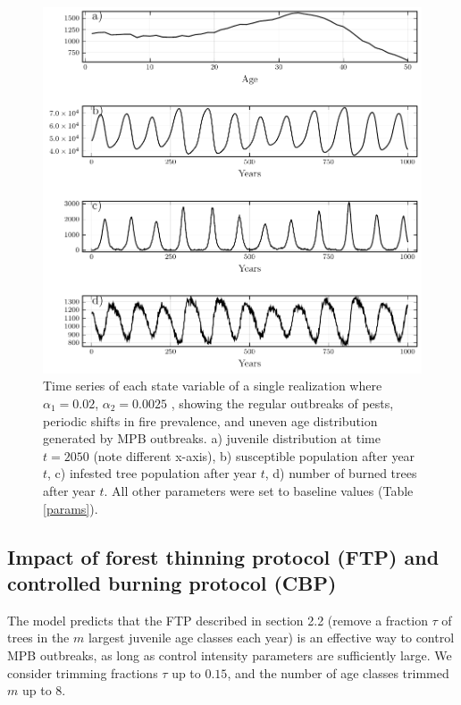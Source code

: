     
    \begin{figure}
      \includegraphics[width=\textwidth]{chapter_3/z1_ts.pdf}
      \caption{Time series of each state variable of a single realization where  $\alpha_1 = 0.02$, $\alpha_2 = 0.0025$ , showing the regular outbreaks of pests, periodic shifts in fire prevalence, and uneven age distribution generated by MPB outbreaks. a) juvenile distribution at time $t=2050$ (note different x-axis), b) susceptible population after year $t$, c) infested tree population after year $t$, d) number of burned trees after year $t$. All other parameters were set to baseline values (Table \ref{params}).}
      \label{z1}
    \end{figure}
    
\subsection{Impact of forest thinning protocol (FTP) and controlled burning protocol (CBP)} 

The model predicts that the FTP described in section 2.2 (remove a fraction $\tau$ of trees in the $m$ largest juvenile age classes each year) is an effective way to control MPB outbreaks, as long as control intensity parameters are sufficiently large. We consider trimming fractions $\tau$ up to $0.15$, and the number of age classes trimmed $m$ up to 8.


